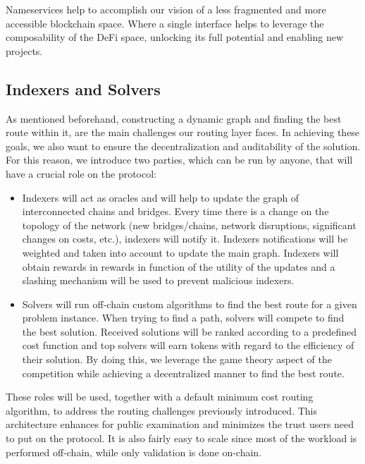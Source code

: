 Nameservices help to accomplish our vision of a less fragmented and more accessible blockchain space. Where a single interface helps to leverage the composability of the DeFi space, unlocking its full potential and enabling new projects.

\subsection{Indexers and Solvers}
As mentioned beforehand, constructing a dynamic graph and finding the best route within it, are the main challenges our routing layer faces. In achieving these goals, we also want to ensure the decentralization and auditability of the solution. For this reason, we introduce two parties, which can be run by anyone, that will have a crucial role on the protocol:

\begin{itemize}
    \item Indexers will act as oracles and will help to update the graph of interconnected chains and bridges. Every time there is a change on the topology of the network (new bridges/chains, network disruptions, significant changes on costs, etc.), indexers will notify it. Indexers notifications will be weighted and taken into account to update the main graph. Indexers will obtain rewards in rewards in function of the utility of the updates and a slashing mechanism will be used to prevent malicious indexers.
    
    \item Solvers will run off-chain custom algorithms to find the best route for a given problem instance. When trying to find a path, solvers will compete to find the best solution. Received solutions will be ranked according to a predefined cost function and top solvers will earn tokens with regard to the efficiency of their solution. By doing this, we leverage the game theory aspect of the competition while achieving a decentralized manner to find the best route.
    
\end{itemize}

These roles will be used, together with a default minimum cost routing algorithm, to address the routing challenges previously introduced. This architecture enhances for public examination and minimizes the trust users need to put on the protocol. It is also fairly easy to scale since most of the workload is performed off-chain, while only validation is done on-chain.